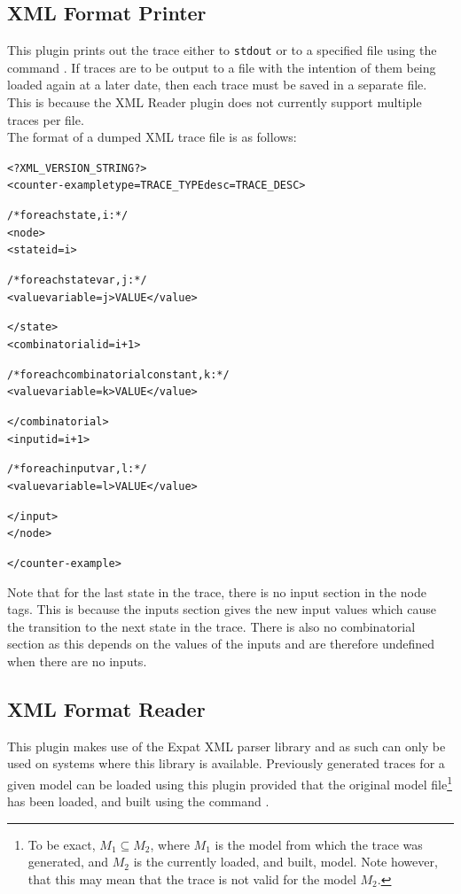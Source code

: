 \subsection{XML Format Printer}
\label{XML Format Printer}

This plugin prints out the trace either to \texttt{stdout} or to a
specified file using the command .  If traces
are to be output to a file with the intention of them being loaded
again at a later date, then each trace must be saved in a separate
file. This is because the XML Reader plugin does not currently support
multiple traces per file.\\The format of a dumped XML trace file is as
follows:

\begin{alltt}
<?XML_VERSION_STRING?>
<counter-example type=TRACE_TYPE desc=TRACE_DESC>

  /* for each state, i: */
  <node>
    <state id=i>

      /* for each state var, j: */
      <value variable=j>VALUE</value>

    </state>
    <combinatorial id=i+1>

      /* for each combinatorial constant, k: */
      <value variable=k>VALUE</value>

    </combinatorial>
    <input id=i+1>

      /* for each input var, l: */
      <value variable=l>VALUE</value>

    </input>
  </node>

</counter-example>
\end{alltt}

Note that for the last state in the trace, there is no input section
in the node tags. This is because the inputs section gives the new
input values which cause the transition to the next state in the
trace. There is also no combinatorial section as this depends on the
values of the inputs and are therefore undefined when there are no
inputs.


\subsection{XML Format Reader}
\label{XML Format Reader}

This plugin makes use of the Expat XML parser library and as such can
only be used on systems where this library is available. Previously
generated traces for a given model can be loaded using this plugin
provided that the original model file\footnote{To be exact, $M_1
\subseteq M_2$, where $M_1$ is the model from which the trace was
generated, and $M_2$ is the currently loaded, and built, model. Note
however, that this may mean that the trace is not valid for the model
$M_2$.} has been loaded, and built using the command .

